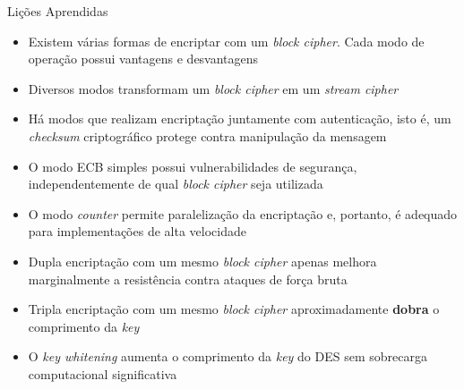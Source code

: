 \documentclass{beamer}
\begin{document}
\begin{frame}{Lições Aprendidas}
  \begin{itemize}
    \item Existem várias formas de encriptar com um \textit{block cipher}. Cada modo de operação possui vantagens e desvantagens

    \item Diversos modos transformam um \textit{block cipher} em um \textit{stream cipher}

    \item Há modos que realizam encriptação juntamente com autenticação, isto é, um \textit{checksum} criptográfico protege contra manipulação da mensagem

    \item O modo ECB simples possui vulnerabilidades de segurança, independentemente de qual \textit{block cipher} seja utilizada

    \item O modo \textit{counter} permite paralelização da encriptação e, portanto, é adequado para implementações de alta velocidade

    \item Dupla encriptação com um mesmo \textit{block cipher} apenas melhora marginalmente a resistência contra ataques de força bruta

    \item Tripla encriptação com um mesmo \textit{block cipher} aproximadamente \textbf{dobra} o comprimento da \textit{key}

    \item O \textit{key whitening} aumenta o comprimento da \textit{key} do DES sem sobrecarga computacional significativa
  \end{itemize}
\end{frame}

\end{document}
